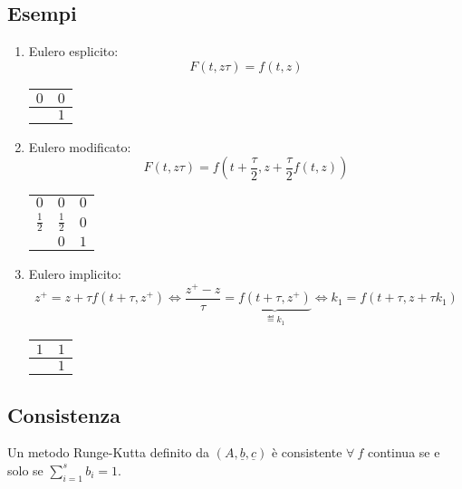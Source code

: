 \documentclass[hidelinks, 10pt]{report}
\begin{document}
\subsection{Esempi}
\begin{enumerate}
\item Eulero esplicito:
\[ F(t, z \tau) = f(t, z) \]

\begin{center}
\begin{tabular}{c|c}
$ 0 $ & $ 0 $ \\
\hline
	  & $ 1 $ \\
\end{tabular}
\end{center}
\item Eulero modificato: 
\[ F(t, z \tau) = f \left( t + \frac{\tau}{2}, z + \frac{\tau}{2} f(t, z) \right) \]

\begin{center}
\begin{tabular}{c|cc}
          $ 0 $ &           $ 0 $ & $ 0 $ \\
$ \frac{1}{2} $ & $ \frac{1}{2} $ & $ 0 $ \\
\hline
                &           $ 0 $ & $ 1 $ \\

\end{tabular}
\end{center}
\item Eulero implicito:
\[ z^{+} = z + \tau f(t + \tau, z^{+}) \iff \frac{z^{+} - z}{\tau} = \underbrace{f(t + \tau, z^{+})}_{\eqdef k_{1}} \iff k_{1} = f(t + \tau, z + \tau k_{1}) \]

\begin{center}
\begin{tabular}{c|c}
$ 1 $ & $ 1 $ \\
\hline
	  & $ 1 $ \\
\end{tabular}
\end{center}
\end{enumerate}

\subsection{Consistenza}
Un metodo Runge-Kutta definito da $ (A, \underline{b}, \underline{c}) $ \`e consistente $ \forall\ f $ continua se e solo se $ \sum\limits_{i = 1}^{s} b_{i} = 1 $.
\end{document}
